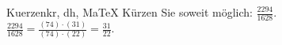 \begin{MAufgabe}{Kuerzen}{kr, dh, MaTeX}
K\"urzen Sie soweit m\"oglich: $\frac{2294}{1628}$.\\ 
\ifLsg\MLoesung
\quad $\frac{2294}{1628}=\frac{(74)\cdot(31)}{(74)\cdot(22)}=\frac{31}{22}$.\else\relax\fi
 \end{MAufgabe}